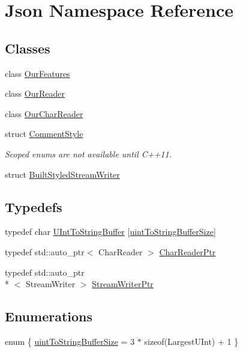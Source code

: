 \hypertarget{namespaceJson}{\section{Json Namespace Reference}
\label{namespaceJson}
}
\subsection*{Classes}
\begin{DoxyCompactItemize}
\item 
class \hyperlink{classJson_1_1OurFeatures}{Our\-Features}
\item 
class \hyperlink{classJson_1_1OurReader}{Our\-Reader}
\item 
class \hyperlink{classJson_1_1OurCharReader}{Our\-Char\-Reader}
\item 
struct \hyperlink{structJson_1_1CommentStyle}{Comment\-Style}
\begin{DoxyCompactList}\small\item\em Scoped enums are not available until C++11. \end{DoxyCompactList}\item 
struct \hyperlink{structJson_1_1BuiltStyledStreamWriter}{Built\-Styled\-Stream\-Writer}
\end{DoxyCompactItemize}
\subsection*{Typedefs}
\begin{DoxyCompactItemize}
\item 
typedef char \hyperlink{namespaceJson_a602bcf69c2042fb61c3b243cb16f04ca}{U\-Int\-To\-String\-Buffer} \mbox{[}\hyperlink{namespaceJson_a0c5f614b019f20b4598dcaec09d9e820ae4f2008c7919f20d81286121d1374424}{uint\-To\-String\-Buffer\-Size}\mbox{]}
\item 
typedef std\-::auto\-\_\-ptr$<$ Char\-Reader $>$ \hyperlink{namespaceJson_a4724efb8d41614b47036cb8b54233837}{Char\-Reader\-Ptr}
\item 
typedef std\-::auto\-\_\-ptr\\*
$<$ Stream\-Writer $>$ \hyperlink{namespaceJson_a7132404aeebfc96d7c6ad2c66260afb5}{Stream\-Writer\-Ptr}
\end{DoxyCompactItemize}
\subsection*{Enumerations}
\begin{DoxyCompactItemize}
\item 
enum \{ \hyperlink{namespaceJson_a0c5f614b019f20b4598dcaec09d9e820ae4f2008c7919f20d81286121d1374424}{uint\-To\-String\-Buffer\-Size} = 3 $\ast$ sizeof(Largest\-U\-Int) + 1
 \}
\end{DoxyCompactItemize}
